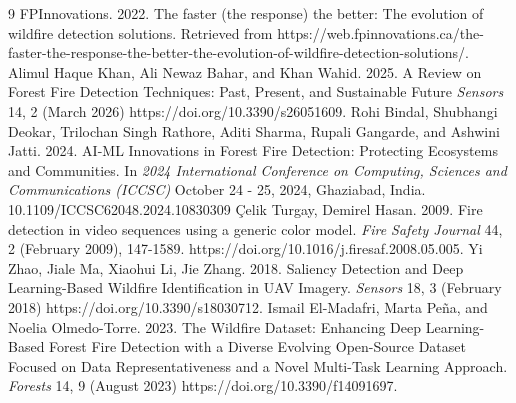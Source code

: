 \documentclass[sigconf]{acmart}
\begin{document}

\begin{thebibliography}{9}
FPInnovations. 2022. The faster (the response) the better: The evolution of wildfire detection solutions. Retrieved from https://web.fpinnovations.ca/the-faster-the-response-the-better-the-evolution-of-wildfire-detection-solutions/.
Alimul Haque Khan, Ali Newaz Bahar, and Khan Wahid. 2025. A Review on Forest Fire Detection Techniques: Past, Present, and Sustainable Future \emph{Sensors} 14, 2 (March 2026) https://doi.org/10.3390/s26051609.
Rohi Bindal, Shubhangi Deokar, Trilochan Singh Rathore, Aditi Sharma, Rupali Gangarde, and Ashwini Jatti. 2024. AI-ML Innovations in Forest Fire Detection: Protecting Ecosystems and Communities. In \emph{2024 International Conference on Computing, Sciences and Communications (ICCSC)} October 24 - 25, 2024, Ghaziabad, India. 10.1109/ICCSC62048.2024.10830309
Çelik Turgay, Demirel Hasan. 2009. Fire detection in video sequences using a generic color model. \emph{Fire Safety Journal} 44, 2 (February 2009), 147-1589. https://doi.org/10.1016/j.firesaf.2008.05.005.
Yi Zhao, Jiale Ma, Xiaohui Li, Jie Zhang. 2018. Saliency Detection and Deep Learning-Based Wildfire Identification in UAV Imagery. \emph{Sensors} 18, 3 (February 2018) https://doi.org/10.3390/s18030712.
Ismail El-Madafri, Marta Peña, and Noelia Olmedo-Torre. 2023. The Wildfire Dataset: Enhancing Deep Learning-Based Forest Fire Detection with a Diverse Evolving Open-Source Dataset Focused on Data Representativeness and a Novel Multi-Task Learning Approach. \emph{Forests} 14, 9 (August 2023) https://doi.org/10.3390/f14091697.
\end{thebibliography}
\end{document}
